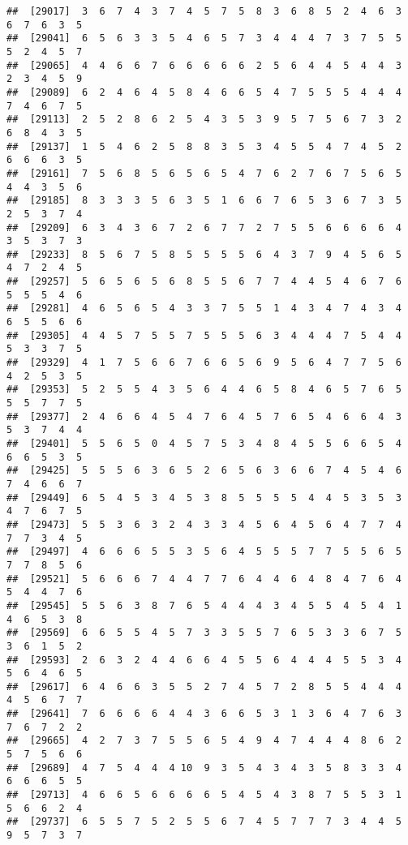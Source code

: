 \documentclass[
]{book}
\begin{document}
\begin{verbatim}
##  [29017]  3  6  7  4  3  7  4  5  7  5  8  3  6  8  5  2  4  6  3  6  7  6  3  5
##  [29041]  6  5  6  3  3  5  4  6  5  7  3  4  4  4  7  3  7  5  5  5  2  4  5  7
##  [29065]  4  4  6  6  7  6  6  6  6  6  2  5  6  4  4  5  4  4  3  2  3  4  5  9
##  [29089]  6  2  4  6  4  5  8  4  6  6  5  4  7  5  5  5  4  4  4  7  4  6  7  5
##  [29113]  2  5  2  8  6  2  5  4  3  5  3  9  5  7  5  6  7  3  2  6  8  4  3  5
##  [29137]  1  5  4  6  2  5  8  8  3  5  3  4  5  5  4  7  4  5  2  6  6  6  3  5
##  [29161]  7  5  6  8  5  6  5  6  5  4  7  6  2  7  6  7  5  6  5  4  4  3  5  6
##  [29185]  8  3  3  3  5  6  3  5  1  6  6  7  6  5  3  6  7  3  5  2  5  3  7  4
##  [29209]  6  3  4  3  6  7  2  6  7  7  2  7  5  5  6  6  6  6  4  3  5  3  7  3
##  [29233]  8  5  6  7  5  8  5  5  5  5  6  4  3  7  9  4  5  6  5  4  7  2  4  5
##  [29257]  5  6  5  6  5  6  8  5  5  6  7  7  4  4  5  4  6  7  6  5  5  5  4  6
##  [29281]  4  6  5  6  5  4  3  3  7  5  5  1  4  3  4  7  4  3  4  6  5  5  6  6
##  [29305]  4  4  5  7  5  5  7  5  5  5  6  3  4  4  4  7  5  4  4  5  3  3  7  5
##  [29329]  4  1  7  5  6  6  7  6  6  5  6  9  5  6  4  7  7  5  6  4  2  5  3  5
##  [29353]  5  2  5  5  4  3  5  6  4  4  6  5  8  4  6  5  7  6  5  5  5  7  7  5
##  [29377]  2  4  6  6  4  5  4  7  6  4  5  7  6  5  4  6  6  4  3  5  3  7  4  4
##  [29401]  5  5  6  5  0  4  5  7  5  3  4  8  4  5  5  6  6  5  4  6  6  5  3  5
##  [29425]  5  5  5  6  3  6  5  2  6  5  6  3  6  6  7  4  5  4  6  7  4  6  6  7
##  [29449]  6  5  4  5  3  4  5  3  8  5  5  5  5  4  4  5  3  5  3  4  7  6  7  5
##  [29473]  5  5  3  6  3  2  4  3  3  4  5  6  4  5  6  4  7  7  4  7  7  3  4  5
##  [29497]  4  6  6  6  5  5  3  5  6  4  5  5  5  7  7  5  5  6  5  7  7  8  5  6
##  [29521]  5  6  6  6  7  4  4  7  7  6  4  4  6  4  8  4  7  6  4  5  4  4  7  6
##  [29545]  5  5  6  3  8  7  6  5  4  4  4  3  4  5  5  4  5  4  1  4  6  5  3  8
##  [29569]  6  6  5  5  4  5  7  3  3  5  5  7  6  5  3  3  6  7  5  3  6  1  5  2
##  [29593]  2  6  3  2  4  4  6  6  4  5  5  6  4  4  4  5  5  3  4  5  6  4  6  5
##  [29617]  6  4  6  6  3  5  5  2  7  4  5  7  2  8  5  5  4  4  4  4  5  6  7  7
##  [29641]  7  6  6  6  6  4  4  3  6  6  5  3  1  3  6  4  7  6  3  7  6  7  2  2
##  [29665]  4  2  7  3  7  5  5  6  5  4  9  4  7  4  4  4  8  6  2  5  7  5  6  6
##  [29689]  4  7  5  4  4  4 10  9  3  5  4  3  4  3  5  8  3  3  4  6  6  6  5  5
##  [29713]  4  6  6  5  6  6  6  6  5  4  5  4  3  8  7  5  5  3  1  5  6  6  2  4
##  [29737]  6  5  5  7  5  2  5  5  6  7  4  5  7  7  7  3  4  4  5  9  5  7  3  7

\end{verbatim}
\end{document}
